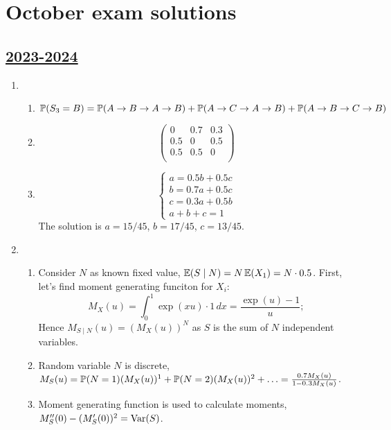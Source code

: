 
\newpage
\thispagestyle{empty}
\section{October exam solutions}



\subsection[2023-2024]{\hyperref[sec:kr_01_2023_2024]{2023-2024}}
\label{sec:sol_kr_01_2023_2024} %


\begin{enumerate}
    \item   
    \begin{enumerate}
      \item $\P(S_3 = B) = \P(A\to B\to A\to B) + \P(A\to C\to A\to B) + \P(A\to B\to C\to B)$
      \item 
      \[
      \begin{pmatrix}
        0 & 0.7 & 0.3 \\
        0.5 & 0 & 0.5 \\
        0.5 & 0.5 & 0 \\
      \end{pmatrix}  
      \]
      \item 
      \[
      \begin{cases}
        a = 0.5 b + 0.5 c \\
        b = 0.7 a + 0.5 c \\
        c = 0.3 a + 0.5 b \\
        a + b + c = 1  
      \end{cases}
      \]
      The solution is $a= 15/45$, $b=17/45$, $c=13/45$.
    \end{enumerate}
    


    \item
  
    \begin{enumerate}
      \item Consider $N$ as known fixed value, $\E(S \mid N) = N\E(X_1) = N\cdot 0.5$.
      First, let's find moment generating funciton for $X_i$:
      \[
      M_X(u) = \int_0^1 \exp(xu) \cdot 1 \, dx = \frac{\exp(u) - 1}{u}; 
      \]
      Hence $M_{S\mid N}(u) = (M_X(u))^N$ as $S$ is the sum of $N$ independent variables.
      \item Random variable $N$ is discrete, $M_S(u) = \P(N=1)(M_X(u))^1 + \P(N=2)(M_X(u))^2 + \ldots = \frac{0.7 M_X(u)}{ 1 -0.3M_X(u)}$.
      \item Moment generating function is used to calculate moments, $M_S''(0) - (M_S'(0))^2 = \Var(S)$.
    \end{enumerate}
  


\end{enumerate}
